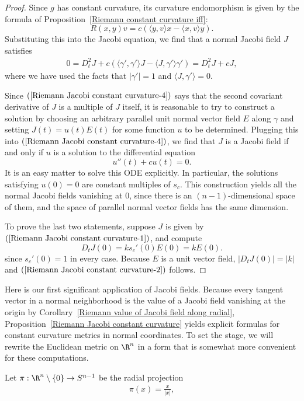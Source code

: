 \begin{proof}
Since $g$ has constant curvature, its curvature endomorphism is given by the formula of Proposition~\ref{Riemann constant curvature iff}:
\[R(x,y)v=c(\langle y,v\rangle x-\langle x,v\rangle y).\]
Substituting this into the Jacobi equation, we find that a normal Jacobi field $J$ satisfies
\begin{align}\label{Riemann Jacobi constant curvature-4}
0=D_t^2J+c(\langle \gamma',\gamma'\rangle J-\langle J,\gamma'\rangle \gamma')=D_t^2J+cJ,
\end{align}
where we have used the facts that $|\gamma'|=1$ and $\langle J,\gamma'\rangle=0$.\par
Since $(\ref{Riemann Jacobi constant curvature-4})$ says that the second covariant derivative of $J$ is a multiple of $J$ itself, it is reasonable to try to construct a 
solution by choosing an arbitrary parallel unit normal vector field $E$ along $\gamma$ and setting $J(t)=u(t)E(t)$ for some function $u$ to be determined. Plugging this 
into $(\ref{Riemann Jacobi constant curvature-4})$, we find that $J$ is a Jacobi field if and only if $u$ is a solution to the differential equation
\[u''(t)+cu(t)=0.\]
It is an easy matter to solve this ODE explicitly. In particular, the solutions satisfying $u(0)=0$ are constant multiples of $s_c$. This construction yields all the 
normal Jacobi fields vanishing at $0$, since there is an $(n-1)$-dimensional space of them, and the space of parallel normal vector fields has the same dimension.\par
To prove the last two statements, suppose $J$ is given by $(\ref{Riemann Jacobi constant curvature-1})$, and compute
\[D_tJ(0)=ks_c'(0)E(0)=kE(0).\]
since $s_c'(0)=1$ in every case. Because $E$ is a unit vector field, $|D_tJ(0)|=|k|$ and $(\ref{Riemann Jacobi constant curvature-2})$ follows.
\end{proof}
Here is our first significant application of Jacobi fields. Because every tangent vector in a normal neighborhood is the value of a Jacobi field vanishing at the origin 
by Corollary~\ref{Riemann value of Jacobi field along radial}, Proposition~\ref{Riemann Jacobi constant curvature} yields explicit formulas for constant curvature metrics in 
normal coordinates. To set the stage, we will rewrite the Euclidean metric on $\R^n$ in a form that is somewhat more convenient for these computations.\par
Let $\pi:\R^n\setminus\{0\}\to S^{n-1}$ be the radial projection
\begin{align}\label{Riemann R^n radial projection}
\pi(x)=\frac{x}{|x|},
\end{align}
